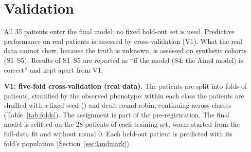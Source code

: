\documentclass[11pt]{article}
\begin{document}
\section{Validation}\label{sec:validation}
All 35 patients enter the final model; no fixed hold-out set is used. Predictive performance on real patients is assessed by cross-validation (V1). What the real data cannot show, because the truth is unknown, is assessed on synthetic cohorts (S1--S5). Results of S1--S5 are reported as ``if the model (S4: the Aim4 model) is correct'' and kept apart from V1.

\textbf{V1: five-fold cross-validation (real data).} The patients are split into \valVk{} folds of \valVper{} patients, stratified by the observed phenotype: within each class the patients are shuffled with a fixed seed (\valVseed) and dealt round-robin, continuing across classes (Table~\ref{tab:folds}). The assignment is part of the pre-registration. The final model is refitted on the 28 patients of each training set, warm-started from the full-data fit and without round 0. Each held-out patient is predicted with its fold's population (Section~\ref{sec:landmark}).


\end{document}
